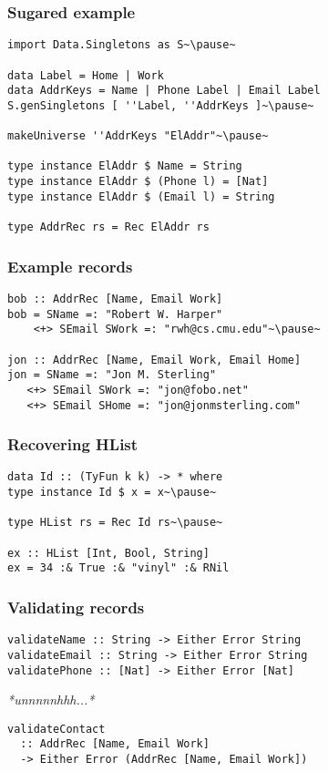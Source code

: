 \documentclass[tikz, 12pt]{beamer}
\begin{document}
\begin{frame}[fragile]
  \frametitle{Sugared example}
  \begin{lstlisting}
import Data.Singletons as S~\pause~

data Label = Home | Work
data AddrKeys = Name | Phone Label | Email Label
S.genSingletons [ ''Label, ''AddrKeys ]~\pause~

makeUniverse ''AddrKeys "ElAddr"~\pause~

type instance ElAddr $ Name = String
type instance ElAddr $ (Phone l) = [Nat]
type instance ElAddr $ (Email l) = String

type AddrRec rs = Rec ElAddr rs
  \end{lstlisting}
\end{frame}

\begin{frame}[fragile]
  \frametitle{Example records}
  \begin{lstlisting}
bob :: AddrRec [Name, Email Work]
bob = SName =: "Robert W. Harper"
    <+> SEmail SWork =: "rwh@cs.cmu.edu"~\pause~

jon :: AddrRec [Name, Email Work, Email Home]
jon = SName =: "Jon M. Sterling"
   <+> SEmail SWork =: "jon@fobo.net"
   <+> SEmail SHome =: "jon@jonmsterling.com"
  \end{lstlisting}
\end{frame}

\begin{frame}[fragile]
  \frametitle{Recovering HList}\pause
  \begin{lstlisting}
data Id :: (TyFun k k) -> * where
type instance Id $ x = x~\pause~

type HList rs = Rec Id rs~\pause~

ex :: HList [Int, Bool, String]
ex = 34 :& True :& "vinyl" :& RNil
  \end{lstlisting}
\end{frame}

\begin{frame}[fragile]
  \frametitle{Validating records}
  \begin{lstlisting}
validateName :: String -> Either Error String
validateEmail :: String -> Either Error String
validatePhone :: [Nat] -> Either Error [Nat]
  \end{lstlisting}
  \pause
  \centerline{\textit{*unnnnnhhh...*}}
  \pause
  \begin{lstlisting}
validateContact
  :: AddrRec [Name, Email Work]
  -> Either Error (AddrRec [Name, Email Work])
  \end{lstlisting}
\end{frame}
\end{document}
